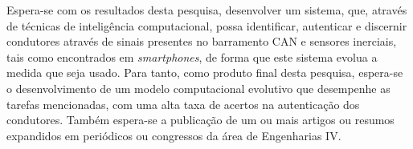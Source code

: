Espera-se com os resultados desta pesquisa, desenvolver um sistema, que, através de técnicas de inteligência computacional, possa identificar, autenticar e discernir condutores através de sinais presentes no barramento CAN e sensores inerciais, tais como encontrados em \textit{smartphones}, de forma que este sistema evolua a medida que seja usado. Para tanto, como produto final desta pesquisa, espera-se o desenvolvimento de um modelo computacional evolutivo que desempenhe as tarefas mencionadas, com uma alta taxa de acertos na autenticação dos condutores. Também espera-se a publicação de um ou mais artigos ou resumos expandidos em periódicos ou congressos da área de Engenharias IV.
